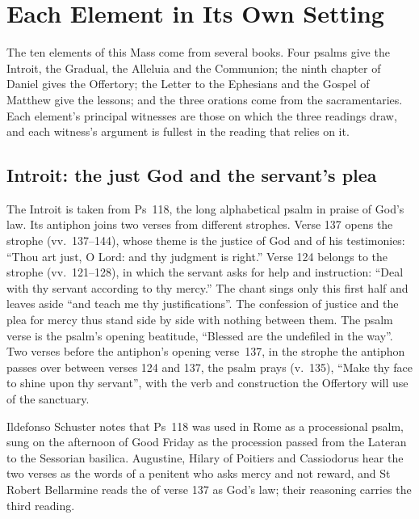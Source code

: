\section{Each Element in Its Own Setting}
\label{sec:each-element}

The ten elements of this Mass come from several books. Four psalms give the
Introit, the Gradual, the Alleluia and the Communion; the ninth chapter of
Daniel gives the Offertory; the Letter to the Ephesians and the Gospel of
Matthew give the lessons; and the three orations come from the
sacramentaries. Each element's principal witnesses are those on which the
three readings draw, and each witness's argument is fullest in the reading
that relies on it.

\subsection{Introit: the just God and the servant's plea}

The Introit is taken from Ps~118, the long alphabetical psalm in praise of
God's law. Its antiphon joins two verses from different strophes. Verse 137
opens the strophe  (vv.~137--144), whose theme is the justice of
God and of his testimonies: ``Thou art just, O Lord: and thy judgment is
right.'' Verse 124 belongs to the strophe  (vv.~121--128), in which
the servant asks for help and instruction: ``Deal with thy servant according to
thy mercy.'' The chant sings only this first half and leaves aside ``and teach
me thy justifications''. The confession of justice and the plea for mercy thus
stand side by side with nothing between them. The psalm verse is the psalm's
opening beatitude, ``Blessed are the undefiled in the way''. Two verses before
the antiphon's opening verse~137, in the strophe the antiphon passes over
between verses 124 and 137, the psalm prays
 (v.~135), ``Make thy face to
shine upon thy servant'', with the verb and construction the Offertory will use
of the sanctuary.

Ildefonso Schuster notes that Ps~118 was used in Rome as a processional
psalm, sung on the afternoon of Good Friday as the procession passed from the
Lateran to the Sessorian basilica. Augustine, Hilary of Poitiers and
Cassiodorus hear the two verses as the words of a penitent who asks mercy and
not reward, and St Robert Bellarmine reads the  of verse 137 as
God's law; their reasoning carries the third reading.

